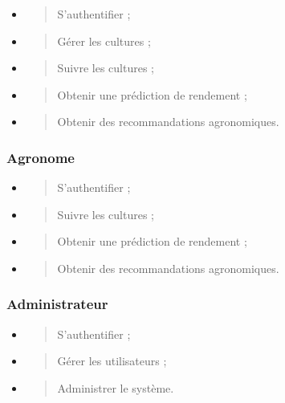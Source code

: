 \begin{itemize}
\item
  \begin{quote}
  S'authentifier ;
  \end{quote}
\item
  \begin{quote}
  Gérer les cultures ;
  \end{quote}
\item
  \begin{quote}
  Suivre les cultures ;
  \end{quote}
\item
  \begin{quote}
  Obtenir une prédiction de rendement ;
  \end{quote}
\item
  \begin{quote}
  Obtenir des recommandations agronomiques.
  \end{quote}
\end{itemize}

\hypertarget{agronome-1}{%
\subsubsection{Agronome}\label{agronome-1}}

\begin{itemize}
\item
  \begin{quote}
  S'authentifier ;
  \end{quote}
\item
  \begin{quote}
  Suivre les cultures ;
  \end{quote}
\item
  \begin{quote}
  Obtenir une prédiction de rendement ;
  \end{quote}
\item
  \begin{quote}
  Obtenir des recommandations agronomiques.
  \end{quote}
\end{itemize}

\hypertarget{administrateur-1}{%
\subsubsection{Administrateur}\label{administrateur-1}}

\begin{itemize}
\item
  \begin{quote}
  S'authentifier ;
  \end{quote}
\item
  \begin{quote}
  Gérer les utilisateurs ;
  \end{quote}
\item
  \begin{quote}
  Administrer le système.
  \end{quote}
\end{itemize}

